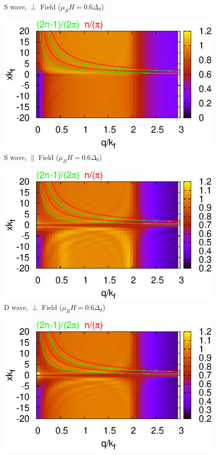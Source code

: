 \documentclass[aps,prl,twocolumn,showpacs,amsmath,amssymb]{revtex4-1}
\begin{document}
\begin{widetext}
\begin{figure}
\caption{ 
	\label{fig:qq} S wave, $\perp$ Field ($\mu_B H=0.6\Delta_0$)
} 
\end{figure}
\begin{figure}
\includegraphics[width=0.7\linewidth]{surface_para_s_F.eps}
\caption{ 
	\label{fig:qq} S wave, $\parallel$ Field ($\mu_B H=0.6\Delta_0$)
} 
\end{figure}
\begin{figure}
\includegraphics[width=0.7\linewidth]{surface_perp_d_F.eps}
\caption{ 
	\label{fig:qq} D wave, $\perp$ Field ($\mu_B H=0.6\Delta_0$)
} 
\end{figure}
\begin{figure}
\includegraphics[width=0.7\linewidth]{surface_para_d_F.eps}

\end{figure}
\end{widetext}
\end{document}
